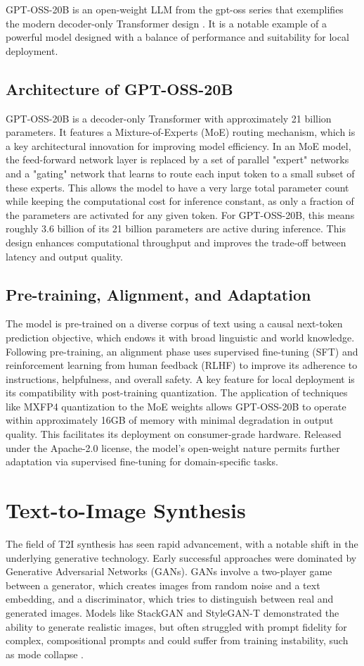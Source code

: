 GPT-OSS-20B is an open-weight LLM from the gpt-oss series that exemplifies the modern decoder-only Transformer design \cite{openai2025gptoss}. It is a notable example of a powerful model designed with a balance of performance and suitability for local deployment.

\subsection{Architecture of GPT-OSS-20B}
GPT-OSS-20B is a decoder-only Transformer with approximately 21 billion parameters. It features a Mixture-of-Experts (MoE) routing mechanism, which is a key architectural innovation for improving model efficiency. In an MoE model, the feed-forward network layer is replaced by a set of parallel "expert" networks and a "gating" network that learns to route each input token to a small subset of these experts. This allows the model to have a very large total parameter count while keeping the computational cost for inference constant, as only a fraction of the parameters are activated for any given token. For GPT-OSS-20B, this means roughly 3.6 billion of its 21 billion parameters are active during inference. This design enhances computational throughput and improves the trade-off between latency and output quality.

\subsection{Pre-training, Alignment, and Adaptation}
The model is pre-trained on a diverse corpus of text using a causal next-token prediction objective, which endows it with broad linguistic and world knowledge. Following pre-training, an alignment phase uses supervised fine-tuning (SFT) and reinforcement learning from human feedback (RLHF) to improve its adherence to instructions, helpfulness, and overall safety. A key feature for local deployment is its compatibility with post-training quantization. The application of techniques like MXFP4 quantization to the MoE weights allows GPT-OSS-20B to operate within approximately 16GB of memory with minimal degradation in output quality. This facilitates its deployment on consumer-grade hardware. Released under the Apache-2.0 license, the model's open-weight nature permits further adaptation via supervised fine-tuning for domain-specific tasks.

\section{Text-to-Image Synthesis}
\label{sec:background_t2i}
The field of T2I synthesis has seen rapid advancement, with a notable shift in the underlying generative technology. Early successful approaches were dominated by Generative Adversarial Networks (GANs). GANs involve a two-player game between a generator, which creates images from random noise and a text embedding, and a discriminator, which tries to distinguish between real and generated images. Models like StackGAN and StyleGAN-T demonstrated the ability to generate realistic images, but often struggled with prompt fidelity for complex, compositional prompts and could suffer from training instability, such as mode collapse \cite{zhang2017stackgan}.

